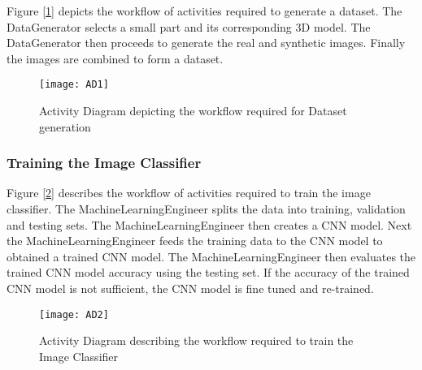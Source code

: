 Figure [\ref{fig:AD1}] depicts the workflow of activities required to generate a dataset. The DataGenerator selects a small part and its corresponding 3D model. The DataGenerator then proceeds to generate the real and synthetic images. Finally the images are combined to form a dataset.

\begin{figure}[H]
\centering
  \texttt{[image: AD1]}
\caption{Activity Diagram depicting the workflow required for Dataset generation}
\label{fig:AD1}
\end{figure}

\subsubsection{Training the Image Classifier}

Figure [\ref{fig:AD2}] describes the workflow of activities required to train the image classifier. The MachineLearningEngineer splits the data into training, validation and testing sets. The MachineLearningEngineer then creates a CNN model. Next the MachineLearningEngineer feeds the training data to the CNN model to obtained a trained CNN model. The MachineLearningEngineer then evaluates the trained CNN model accuracy using the testing set. If the accuracy of the trained CNN model is not sufficient, the CNN model is fine tuned and re-trained.

\begin{figure}[H]
\centering
  \texttt{[image: AD2]}
\caption{Activity Diagram describing the workflow required to train the Image Classifier}
\label{fig:AD2}
\end{figure}
